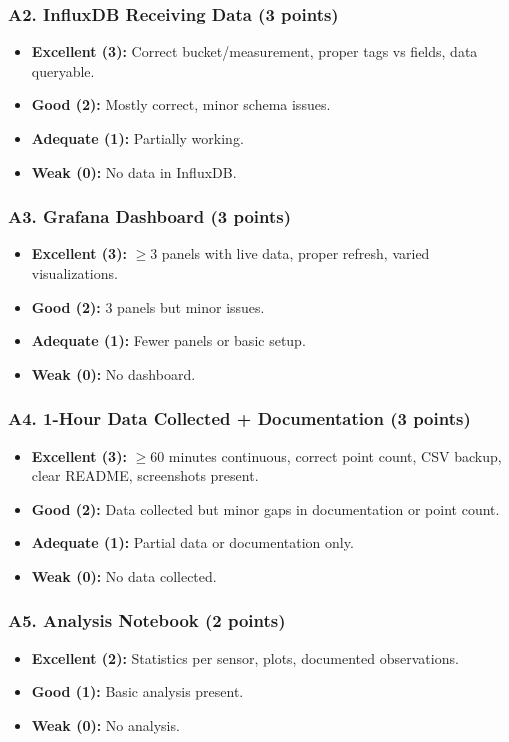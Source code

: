 \documentclass[11pt]{article}
\begin{document}
\subsubsection*{A2. InfluxDB Receiving Data (3 points)}
\begin{itemize}[noitemsep]
    \item \textbf{Excellent (3):} Correct bucket/measurement, proper tags vs fields, data queryable.
    \item \textbf{Good (2):} Mostly correct, minor schema issues.
    \item \textbf{Adequate (1):} Partially working.
    \item \textbf{Weak (0):} No data in InfluxDB.
\end{itemize}

\subsubsection*{A3. Grafana Dashboard (3 points)}
\begin{itemize}[noitemsep]
    \item \textbf{Excellent (3):} $\geq$3 panels with live data, proper refresh, varied visualizations.
    \item \textbf{Good (2):} 3 panels but minor issues.
    \item \textbf{Adequate (1):} Fewer panels or basic setup.
    \item \textbf{Weak (0):} No dashboard.
\end{itemize}

\subsubsection*{A4. 1-Hour Data Collected + Documentation (3 points)}
\begin{itemize}[noitemsep]
    \item \textbf{Excellent (3):} $\geq$60 minutes continuous, correct point count, CSV backup, clear README, screenshots present.
    \item \textbf{Good (2):} Data collected but minor gaps in documentation or point count.
    \item \textbf{Adequate (1):} Partial data or documentation only.
    \item \textbf{Weak (0):} No data collected.
\end{itemize}

\subsubsection*{A5. Analysis Notebook (2 points)}
\begin{itemize}[noitemsep]
    \item \textbf{Excellent (2):} Statistics per sensor, plots, documented observations.
    \item \textbf{Good (1):} Basic analysis present.
    \item \textbf{Weak (0):} No analysis.
\end{itemize}
\end{document}
